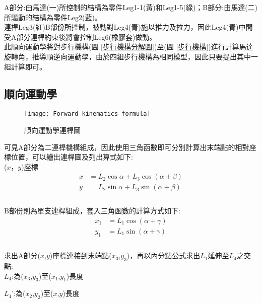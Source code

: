 A部分:由馬達(一)所控制的結構為零件Leg1-1(黃)和Leg1-5(綠)；B部分:由馬達(二)所驅動的結構為零件Leg2(藍)。\\

連桿Leg3(紅)B部份所控制，被動對Leg4(青)施以推力及拉力，因此Leg4(青)中間受A部分連桿約束後將會控制Leg6(橡膠套)做動。\\

此順向運動學將對步行機構(圖 \ref{步行機構分解圖})至(圖 \ref{步行機構})進行計算馬達旋轉角，推導順逆向運動學，由於四組步行機構為相同模型，因此只要提出其中一組計算即可。\
\newpage

\subsection{順向運動學}

\begin{figure}[hbt!]
\begin{center}
\texttt{[image: Forward kinematics formula]}
\caption{\Large 順向運動學連桿圖}\label{Forward kinematics formula}
\end{center}
\end{figure}

可見A部分為二連桿機構組成，因此使用三角函數即可分別計算出末端點的相對座標位置，可以繪出連桿圖及列出算式如下:\\

($x$，$y$)座標
\[
\begin{aligned}
x&=L_{2}\cos \alpha +L_{3}\cos \left( \alpha +\beta \right)\\
y&=L_{2}\sin \alpha +L_{3}\sin \left( \alpha +\beta \right)\\
\end{aligned}
\]\\

B部份則為單支連桿組成，套入三角函數的計算方式如下:\\

\[
\begin{aligned}
x_{1}&=L_{1}\cos \left( \alpha +\gamma \right)\\
y_{1}&=L_{1}\sin \left( \alpha +\gamma \right)\\
\end{aligned}
\]\\

求出A部分($x$,$y$)座標連接到末端點($x_3$,$y_3$)，再以內分點公式求出$L_1$延伸至$L_4$之交點:\\

$L_4$:為($x_3$,$y_3$)至($x_1$,$y_1$)長度\

$L_4$':為($x_2$,$y_2$)至($x$,$y$)長度\\

